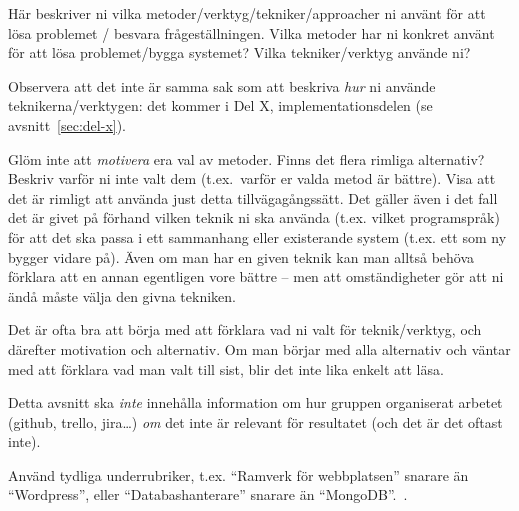 Här beskriver ni vilka metoder/verktyg/tekniker/approacher ni använt för att lösa problemet / besvara frågeställningen.  Vilka metoder har ni konkret använt för att lösa problemet/bygga systemet?  Vilka tekniker/verktyg använde ni?

Observera att det inte är samma sak som att beskriva \emph{hur} ni använde teknikerna/verktygen: det kommer i Del X, implementationsdelen (se avsnitt~\ref{sec:del-x}).

Glöm inte att \emph{motivera} era val av metoder. Finns det flera rimliga alternativ? Beskriv varför ni inte valt dem (t.ex.~varför er valda metod är bättre).
Visa att det är rimligt att använda just detta tillvägagångssätt.
Det gäller även i det fall det är givet på förhand vilken teknik ni ska använda (t.ex. vilket programspråk) för att det ska passa i ett sammanhang eller existerande system (t.ex. ett som ny bygger vidare på). 
Även om man har en given teknik kan man alltså behöva förklara att en annan egentligen vore bättre -- men att omständigheter gör att ni ändå måste välja den givna tekniken.

Det är ofta bra att börja med att förklara vad ni valt för teknik/verktyg, och därefter motivation och alternativ. Om man börjar med alla alternativ och väntar med att förklara vad man valt till sist, blir det inte lika enkelt att läsa.

Detta avsnitt ska \emph{inte} innehålla information om hur gruppen organiserat arbetet (github, trello, jira\ldots) \emph{om} det inte är relevant för resultatet (och det är det oftast inte).

Använd tydliga underrubriker, t.ex. ``Ramverk för webbplatsen'' snarare än ``Wordpress'', eller ``Databashanterare'' snarare än ``MongoDB''.~\cite{mongo}.

